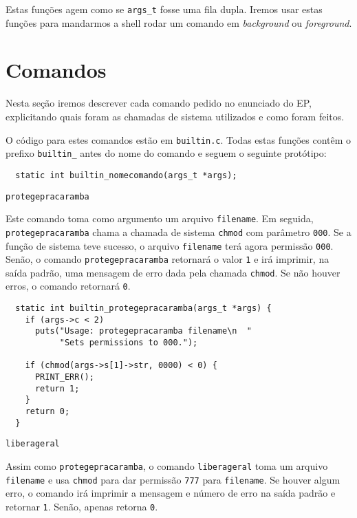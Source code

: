\documentclass{amsart}
\makeatletter
\def\subsection{\@startsection{subsection}{3}%
  \z@{.5\linespacing\@plus.7\linespacing}{.1\linespacing}%
  {\normalfont\itshape}}
\theoremstyle{plain}
\newcommand{\code}[1]{\lstinline[mathescape=true]{#1}}
\makeatother
\begin{document}
Estas funções agem como se \code{args_t} fosse uma fila dupla. Iremos usar estas funções para
mandarmos a shell rodar um comando em \textit{background} ou \textit{foreground}.

\section{Comandos}

Nesta seção iremos descrever cada comando pedido no enunciado do EP, explicitando quais foram as
chamadas de sistema utilizados e como foram feitos.

O código para estes comandos estão em \code{builtin.c}. Todas estas funções contêm o prefixo
\code{builtin_} antes do nome do comando e seguem o seguinte protótipo:

\begin{verbatim}
  static int builtin_nomecomando(args_t *args);
\end{verbatim}

\subsection{\code{protegepracaramba}}

Este comando toma como argumento um arquivo \code{filename}. Em seguida,\\ \code{protegepracaramba}
chama a chamada de sistema \code{chmod} com parâmetro \code{000}. Se a função de sistema teve
sucesso, o arquivo \code{filename} terá agora permissão \code{000}. Senão, o comando
\code{protegepracaramba} retornará o valor \code{1} e irá imprimir, na saída padrão, uma mensagem
de erro dada pela chamada \code{chmod}. Se não houver erros, o comando retornará \code{0}.

\begin{verbatim}
  static int builtin_protegepracaramba(args_t *args) {
    if (args->c < 2)
      puts("Usage: protegepracaramba filename\n  "
           "Sets permissions to 000.");

    if (chmod(args->s[1]->str, 0000) < 0) {
      PRINT_ERR();
      return 1;
    }
    return 0;
  }
\end{verbatim}

\subsection{\code{liberageral}}

Assim como \code{protegepracaramba}, o comando \code{liberageral} toma um arquivo \code{filename} e
usa \code{chmod} para dar permissão \code{777} para \code{filename}. Se houver algum erro, o
comando irá imprimir a mensagem e número de erro na saída padrão e retornar \code{1}. Senão, apenas
retorna \code{0}.
\end{document}
